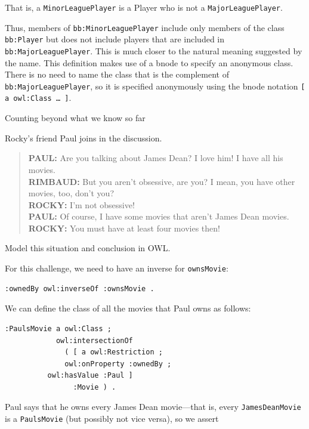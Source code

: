 That is, a \texttt{MinorLeaguePlayer} is a Player who is not a \texttt{MajorLeaguePlayer}.

Thus, members of \texttt{bb:MinorLeaguePlayer} include only members of the class
\texttt{bb:Player} but does not include players that are included in
\texttt{bb:MajorLeaguePlayer}. This is much closer to the natural meaning
suggested by the name. This definition makes use of a bnode to specify
an anonymous class. There is no need to name the class that is the
complement of \texttt{bb:MajorLeaguePlayer}, so it is specified anonymously using
the bnode notation \texttt{{[} a owl:Class \ldots{} {]}}.

\begin{challenge}{Counting beyond what we know so far}
\label{chal:35}

Rocky's friend Paul joins in the discussion.

\begin{quote}
\textbf{PAUL:} Are you talking about James Dean? I love him! I have all his
movies. \\
\textbf{RIMBAUD:} But you aren't obsessive, are you? I mean, you have other
movies, too, don't you?  \\
\textbf{ROCKY:} I'm not obsessive! \\
\textbf{PAUL:} Of course, I have some movies that aren't James Dean movies. \\
\textbf{ROCKY:} You must have at least four movies then! 
\end{quote}

Model this situation and conclusion in OWL.

\solution

For this challenge, we need to have an inverse for \texttt{ownsMovie}:

\begin{lstlisting}
:ownedBy owl:inverseOf :ownsMovie .
\end{lstlisting}

We can define the class of all the movies that Paul owns as follows:

\begin{lstlisting}
:PaulsMovie a owl:Class ;
            owl:intersectionOf
              ( [ a owl:Restriction ;
	          owl:onProperty :ownedBy ;
		  owl:hasValue :Paul ]
                :Movie ) .
\end{lstlisting}

Paul says that he owns every James Dean movie---that is, every
\texttt{JamesDeanMovie} is a \texttt{PaulsMovie}
(but possibly not vice versa), so we assert


\end{challenge}
